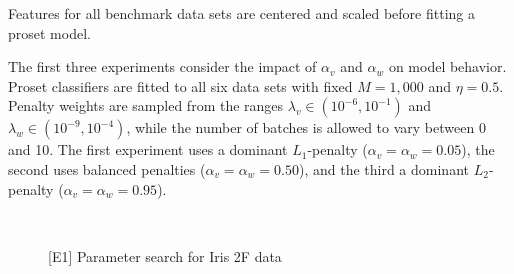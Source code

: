 %
Features for all benchmark data sets are centered and scaled before fitting a proset model.\par
%
The first three experiments consider the impact of $\alpha_v$ and $\alpha_w$ on model behavior.
Proset classifiers are fitted to all six data sets with fixed $M=1,000$ and $\eta=0.5$.
Penalty weights are sampled from the ranges $\lambda_v\in(10^{-6},10^{-1})$ and $\lambda_w\in(10^{-9},10^{-4})$, while the number of batches is allowed to vary between 0 and 10.
The first experiment uses a dominant $L_1$-penalty ($\alpha_v=\alpha_w=0.05$), the second uses balanced penalties ($\alpha_v=\alpha_w=0.50$), and the third a dominant $L_2$-penalty ($\alpha_v=\alpha_w=0.95$).\par
%
\begin{figure}
\caption{[E1] Parameter search for Iris 2F data}
\label{fig_parameter_search}
%
\begin{center}
\\
\end{center}
\end{figure}
